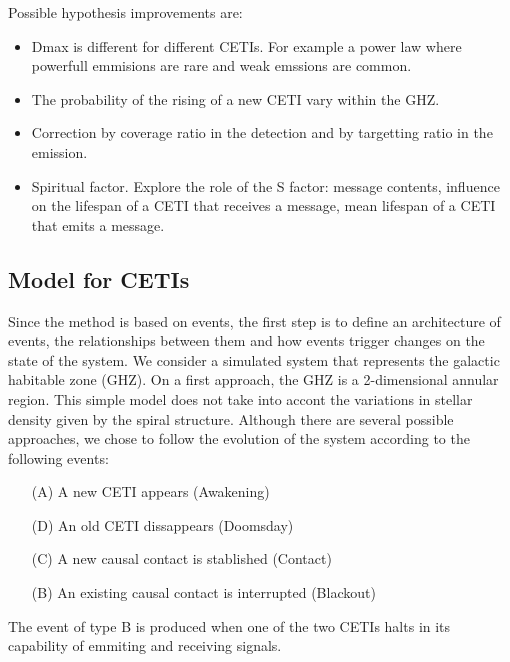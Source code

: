 \documentclass[crop]{CSLB}%
\begin{document}
Possible hypothesis improvements are:

\begin{itemize}
   \item Dmax is different for different CETIs.  For example a power
      law where powerfull emmisions are rare and weak emssions are
      common.
   \item The probability of the rising of a new CETI vary within the
      GHZ.
   \item Correction by coverage ratio in the detection and by
      targetting ratio in the emission.
   \item Spiritual factor.  Explore the role of the S factor: message
      contents, influence on the lifespan of a CETI that receives a
      message, mean lifespan of a CETI that emits a message.
\end{itemize}


\subsection{Model for CETIs}


Since the method is based on events, the first step is to define an
architecture of events, the relationships between them and how events
trigger changes on the state of the system.
%
We consider a simulated system that represents the galactic habitable
zone (GHZ).
%
On a first approach, the GHZ is a 2-dimensional annular region.
%
This simple model does not take into accont the variations in stellar
density given by the spiral structure.
%
Although there are several possible approaches, we chose to follow the
evolution of the system according to the following events:


\begin{enumerate}
   \item[(A)] A new CETI appears (Awakening)
   \item[(D)] An old CETI dissappears (Doomsday)
   \item[(C)] A new causal contact is stablished (Contact)
   \item[(B)] An existing causal contact is interrupted (Blackout)
\end{enumerate}


The event of type B is produced when one of the two CETIs halts in its
capability of emmiting and receiving signals.



\end{document}
